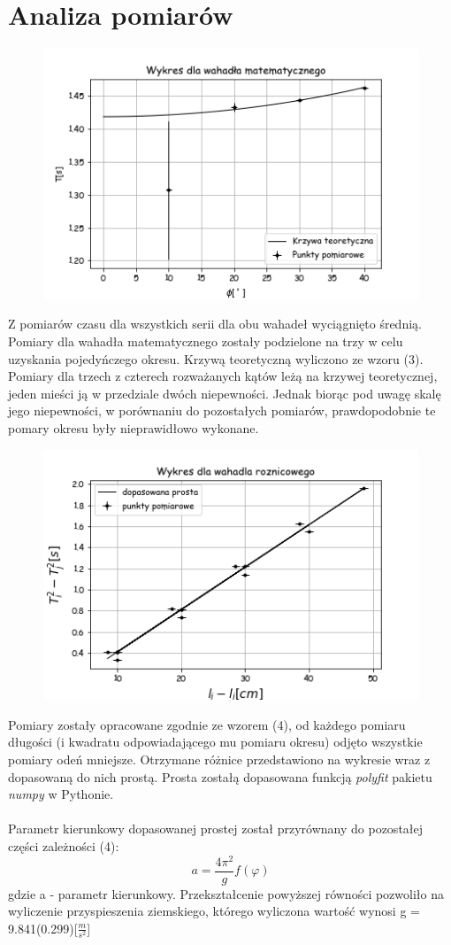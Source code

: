 \documentclass[a4paper,10pt]{article}
\begin{document}
\section{Analiza pomiarów}
\begin{figure}[H]
    \includegraphics{./Wykres_matematyczne.png}
    \caption{}
    \label{}
\end{figure}
Z pomiarów czasu dla wszystkich serii dla obu wahadeł wyciągnięto średnią. Pomiary dla wahadła matematycznego zostały podzielone na trzy w celu uzyskania pojedyńczego okresu. Krzywą teoretyczną wyliczono ze wzoru (3). Pomiary dla trzech z czterech rozważanych kątów leżą na krzywej teoretycznej, jeden mieści ją w przedziale dwóch niepewności.
Jednak biorąc pod uwagę skalę jego niepewności, w porównaniu do pozostałych pomiarów, prawdopodobnie te pomary okresu były nieprawidłowo wykonane.
\begin{figure}[H]
    \includegraphics{./Wykres_roznicowe.png}
    \caption{}
    \label{}
\end{figure}
Pomiary zostały opracowane zgodnie ze wzorem (4), od każdego pomiaru długości (i kwadratu odpowiadającego mu pomiaru okresu) odjęto wszystkie pomiary odeń mniejsze. Otrzymane różnice przedstawiono na wykresie wraz z dopasowaną do nich prostą. Prosta zostałą dopasowana funkcją \emph{polyfit} pakietu \emph{numpy} 
w Pythonie.\\
\\
Parametr kierunkowy dopasowanej prostej został przyrównany do pozostałej części zależności (4):
\begin{equation}
a = \frac{4 \pi^2}{g} f(\varphi)
\end{equation}
gdzie a - parametr kierunkowy. Przekształcenie powyższej równości pozwoliło na wyliczenie przyspieszenia ziemskiego, którego wyliczona wartość wynosi g = 9.841(0.299)[$\frac{m}{s^2}$]
\end{document}
